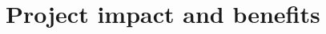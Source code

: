 \documentclass{article}
\begin{document}
%

\section{Project impact and benefits}

\pagebreak
\section*{\bibname}
\printbibliography[heading=none]
\end{document}
